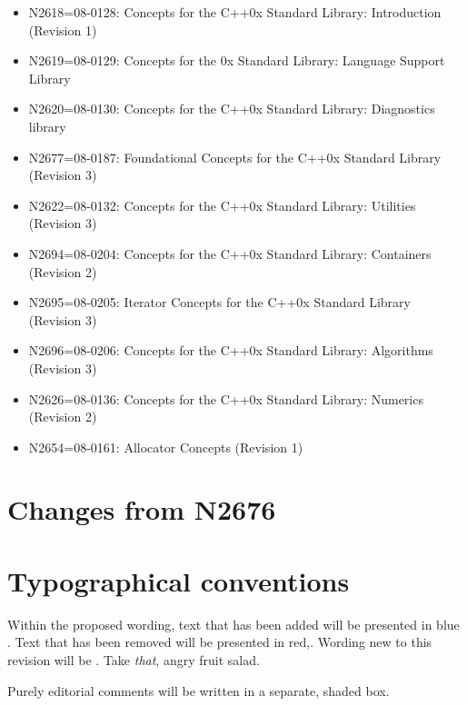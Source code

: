 \documentclass[american]{book}
\newcommand{\editorial}[1]{\colorbox{editbackground}{\begin{minipage}{\linewidth
}#1\end{minipage}}}
\begin{document}
\begin{titlepage}
\begin{itemize}
\item N2618=08-0128: Concepts for the C++0x Standard Library: Introduction (Revision 1)
\item N2619=08-0129: Concepts for the \Cpp{}0x Standard Library:
  Language Support Library
\item N2620=08-0130: Concepts for the C++0x Standard Library:
  Diagnostics library
\item N2677=08-0187: Foundational Concepts for the C++0x Standard Library
  (Revision 3)
\item N2622=08-0132: Concepts for the C++0x Standard Library:
  Utilities (Revision 3)
\item N2694=08-0204: Concepts for the C++0x Standard Library:
  Containers (Revision 2)
\item N2695=08-0205: Iterator Concepts for the C++0x Standard Library
  (Revision 3)
\item N2696=08-0206: Concepts for the C++0x Standard Library:
  Algorithms (Revision 3)
\item N2626=08-0136: Concepts for the C++0x Standard Library: Numerics
  (Revision 2)
\item N2654=08-0161: Allocator Concepts (Revision 1)
\end{itemize}

\section*{Changes from N2676}

\section*{Typographical conventions}
Within the proposed wording, text that has been added
\textcolor{addclr}{will be presented in blue} . Text that has been removed will be
presented \textcolor{remclr}{in red},. Wording new to this revision will be 
. Take \emph{that}, angry fruit salad.

\editorial{Purely editorial comments will be written in a separate,
  shaded box.}
\end{titlepage}

\pagestyle{fancy}
\fancyhead[LE,RO]{\textbf{\rightmark}}
\fancyhead[RE]{\textbf{\leftmark\hspace{1em}\thepage}}
\fancyhead[LO]{\textbf{\thepage\hspace{1em}\leftmark}}
\end{document}
